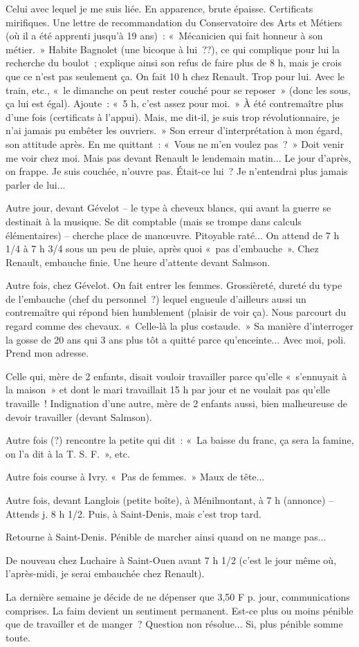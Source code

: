 \documentclass[french,twoside]{book} %
\begin{document}
Celui avec lequel je me suis liée. En apparence, brute épaisse. Certificats mirifiques. Une lettre de recommandation du Conservatoire des Arts et Métiers (où il a été apprenti jusqu'à 19 ans) : « Mécanicien qui fait honneur à son métier. » Habite Bagnolet (une bicoque à lui ??), ce qui complique pour lui la recherche du boulot ; explique ainsi son refus de faire plus de 8 h, mais je crois que ce n'est pas seulement ça. On fait 10 h chez Renault. Trop pour lui. Avec le train, etc., « le dimanche on peut rester couché pour se reposer » (donc les sous, ça lui est égal). Ajoute : « 5 h, c'est assez pour moi. » À été contremaître plus d'une fois (certificats à l'appui). Mais, me dit-il, je suis trop révolutionnaire, je n’ai jamais pu embêter les ouvriers. » Son erreur d’interprétation à mon égard, son attitude après. En me quittant : « Vous ne m'en voulez pas ? » Doit venir me voir chez moi. Mais pas devant Renault le lendemain matin... Le jour d'après, on frappe. Je suis couchée, n'ouvre pas. Était-ce lui ? Je n'entendrai plus jamais parler de lui...\par
Autre jour, devant Gévelot – le type à cheveux blancs, qui avant la guerre se destinait à la musique. Se dit comptable (mais se trompe dans calculs élémentaires) – cherche place de manœuvre. Pitoyable raté... On attend de 7 h 1/4 à 7 h 3/4 sous un peu de pluie, après quoi « pas d'embauche ». Chez Renault, embauche finie. Une heure d'attente devant Salmson.\par
Autre fois, chez Gévelot. On fait entrer les femmes. Grossièreté, dureté du type de l'embauche (chef du personnel ?) lequel engueule d'ailleurs aussi un contremaître qui répond bien humblement (plaisir de voir ça). Nous parcourt du regard comme des chevaux. « Celle-là la plus costaude. » Sa manière d'interroger la gosse de 20 ans qui 3 ans plus tôt a quitté parce qu'enceinte... Avec moi, poli. Prend mon adresse.\par
Celle qui, mère de 2 enfants, disait vouloir travailler parce qu'elle « s'ennuyait à la maison » et dont le mari travaillait 15 h par jour et ne voulait pas qu'elle travaille ! Indignation d'une autre, mère de 2 enfants aussi, bien malheureuse de devoir travailler (devant Salmson).\par
Autre fois (?) rencontre la petite qui dit : « La baisse du franc, ça sera la famine, on l'a dit à la T. S. F. », etc.\par
Autre fois course à Ivry. « Pas de femmes. » Maux de tête...\par
Autre fois, devant Langlois (petite boîte), à Ménilmontant, à 7 h (annonce) – Attends j. 8 h 1/2. Puis, à Saint-Denis, mais c'est trop tard.\par
Retourne à Saint-Denis. Pénible de marcher ainsi quand on ne mange pas...\par
De nouveau chez Luchaire à Saint-Ouen avant 7 h 1/2 (c'est le jour même où, l'après-midi, je serai embauchée chez Renault).\par
La dernière semaine je décide de ne dépenser que 3,50 F p. jour, communications comprises. La faim devient un sentiment permanent. Est-ce plus ou moins pénible que de travailler et de manger ? Question non résolue... Si, plus pénible somme toute.
\end{document}
